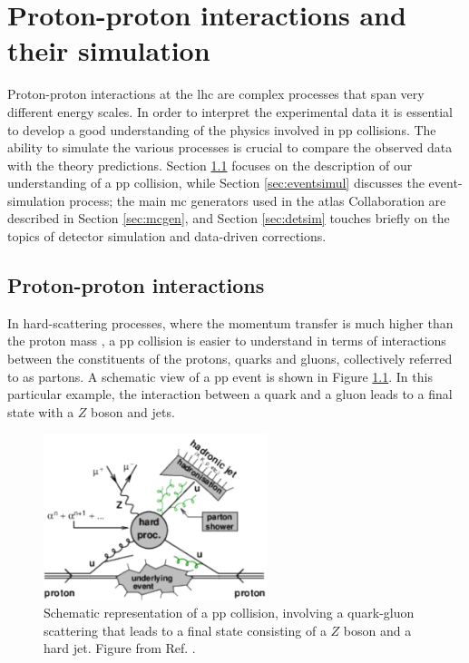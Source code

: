 \chapter{Proton-proton interactions and their simulation}
\label{chap:event:MC}

Proton-proton interactions at the \gls{lhc} are complex processes that span very different energy scales. 
In order to interpret the experimental data it is essential to develop a good understanding of the physics involved in \gls{pp} collisions. 
The ability to simulate the various processes is crucial to compare the observed data with the theory predictions.
Section \ref{sec:ppint} focuses on the description of our understanding of a \gls{pp} collision, while Section \ref{sec:eventsimul} 
discusses the event-simulation process; 
the main \gls{mc} generators used in the \gls{atlas} Collaboration are described in Section \ref{sec:mcgen}, and Section \ref{sec:detsim} touches briefly on the topics of detector simulation and data-driven corrections.



\section{Proton-proton interactions}
\label{sec:ppint}

In hard-scattering processes, where the momentum transfer is much higher than the proton mass \cite{Butterworth:2012fj}, 
a \gls{pp} collision is easier to understand in terms of interactions between the constituents of the protons, quarks and gluons, 
collectively referred to as partons. A schematic view of a \gls{pp} event is shown in Figure \ref{fig:sim:pp2}. In this particular example, the interaction between a quark and a gluon leads to a final state with a $Z$ boson and jets. 

\begin{figure}[h]
\begin{center}
    \includegraphics[width=0.58\textwidth]{figures/simul/ppcoll2}
\end{center}
 \caption{Schematic representation of a \gls{pp} collision, involving a quark-gluon scattering that leads to a final state consisting of a $Z$ boson and a hard jet. Figure from Ref. \cite{Butterworth:2012fj}.}
  \label{fig:sim:pp2}
\end{figure}

